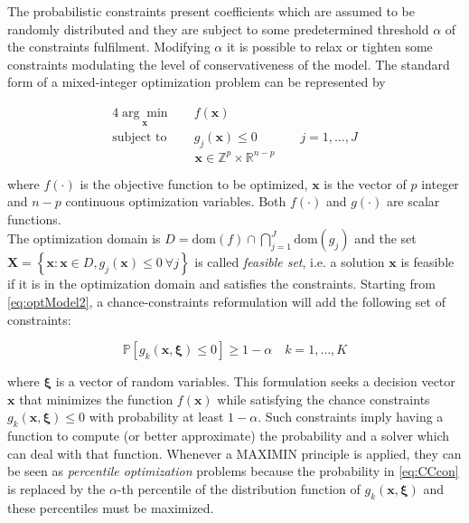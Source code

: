 The probabilistic constraints present coefficients which are assumed to be randomly distributed and they are subject to some predetermined threshold $\alpha$ of the constraints fulfilment. Modifying $\alpha$ it is possible to relax or tighten some constraints modulating the level of conservativeness of the model.
The standard form of a mixed-integer optimization problem can be represented by  

		\begin{alignat}{4}\label{eq:optModel2}	\underset{\mathbf{x}}{\arg \min} \quad & f(\mathbf{x}) &&\quad  & \\
	\nonumber
	\text{subject to} \quad & g_j(\mathbf{x}) \leq 0 &&\quad & j=1,\ldots,J
	\end{alignat}
	\begin{equation}\nonumber
		 \mathbf{x} \in \mathbb{Z}^p \times \mathbb{R}^{n-p}   
	\end{equation}

where $f(\cdot)$ is the objective function to be optimized, $\mathbf{x}$ is the vector of $p$ integer and $n-p$ continuous optimization variables. Both $f(\cdot)$ and $g(\cdot)$ are scalar functions.\\
The optimization domain is $D=\text{dom}(f) \cap \bigcap_{j=1}^J \text{dom}(g_j)$ and the set \\ $\mathbf{X}=\left\{\mathbf{x} : \mathbf{x} \in D, g_j(\mathbf{x}) \leq 0 \ \forall j \right\}$ is called \emph{feasible set}, i.e. a solution $\mathbf{x}$ is feasible if it is in the optimization domain and satisfies the constraints. Starting from \eqref{eq:optModel2}, a chance-constraints reformulation will add the following set of constraints:

\begin{equation}\label{eq:CCcon}
\mathbb{P}\left[g_k(\mathbf{x},\boldsymbol{\xi})\leq 0\right] \geq 1-\alpha \quad k=1,\ldots,K
\end{equation}

where $\boldsymbol{\xi}$ is a vector of random variables. This formulation seeks a decision vector $\mathbf{x}$  that minimizes the function $f(\mathbf{x})$ while satisfying the chance constraints $g_k(\mathbf{x},\boldsymbol{\xi})\leq 0$ with probability at least $1-\alpha$. Such constraints imply having a function to compute (or better approximate) the probability and a solver which can deal with that function. Whenever a MAXIMIN principle is applied, they can be seen as \emph{percentile optimization} problems \parencite{krokhmal2002portfolio} because the probability in \eqref{eq:CCcon} is replaced by the $\alpha$-th percentile of the distribution function of $g_k(\mathbf{x},\boldsymbol{\xi})$ and these percentiles must be maximized.

